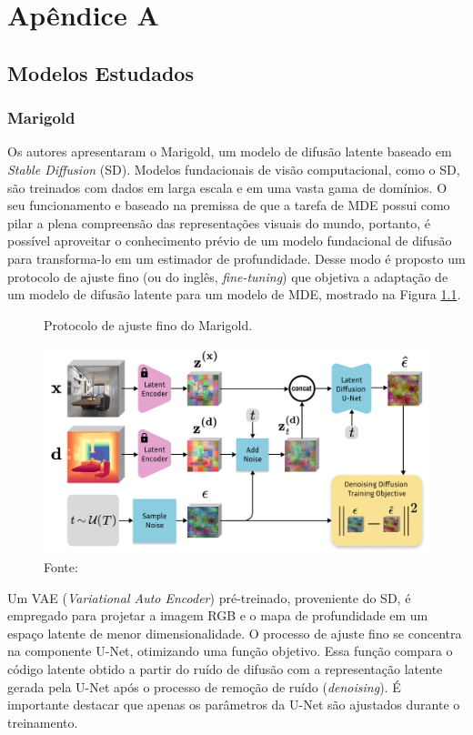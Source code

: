 \chapter{Apêndice A}
\label{appendixA}

\section{Modelos Estudados}

\subsection{Marigold}

Os autores \cite{ke2024repurposing} apresentaram o Marigold, um modelo de difusão latente baseado em \textit{Stable Diffusion} (SD). Modelos fundacionais de visão computacional, como o SD, são treinados com dados em larga escala e em uma vasta gama de domínios. O seu funcionamento e baseado na premissa de que a tarefa de MDE possui como pilar a plena compreensão das representações visuais do mundo, portanto, é possível aproveitar o conhecimento prévio de um modelo fundacional de difusão para transforma-lo em um estimador de profundidade. Desse modo é proposto um protocolo de ajuste fino (ou do inglês, \textit{fine-tuning}) que objetiva a adaptação de um modelo de difusão latente para um modelo de MDE, mostrado na Figura \ref{marifino}.

\begin{figure}[h]
    \centering
    \caption{Protocolo de ajuste fino do Marigold.}
    \includegraphics[width=.8\textwidth]{fig/mariouro.png}
    \caption*{Fonte: }
    \label{marifino}
\end{figure}

Um VAE (\textit{Variational Auto Encoder}) pré-treinado, proveniente do SD, é empregado para projetar a imagem RGB e o mapa de profundidade em um espaço latente de menor dimensionalidade. O processo de ajuste fino se concentra na componente U-Net, otimizando uma função objetivo. Essa função compara o código latente obtido a partir do ruído de difusão com a representação latente gerada pela U-Net após o processo de remoção de ruído (\textit{denoising}). É importante destacar que apenas os parâmetros da U-Net são ajustados durante o treinamento. 

